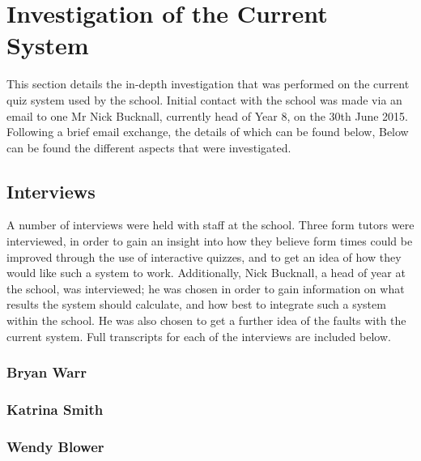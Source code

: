 \section{Investigation of the Current System}
This section details the in-depth investigation that was performed on the current quiz system used by the school. Initial contact with the school was made via an email to one Mr Nick Bucknall, currently head of Year 8, on the 30th June 2015. Following a brief email exchange, the details of which can be found below, Below can be found the different aspects that were investigated.


\subsection{Interviews}
A number of interviews were held with staff at the school. Three form tutors were interviewed, in order to gain an insight into how they believe form times could be improved through the use of interactive quizzes, and to get an idea of how they would like such a system to work. Additionally, Nick Bucknall, a head of year at the school, was interviewed; he was chosen in order to gain information on what results the system should calculate, and how best to integrate such a system within the school. He was also chosen to get a further idea of the faults with the current system. Full transcripts for each of the interviews are included below.

\subsubsection{Bryan Warr}

\subsubsection{Katrina Smith}

\subsubsection{Wendy Blower}

